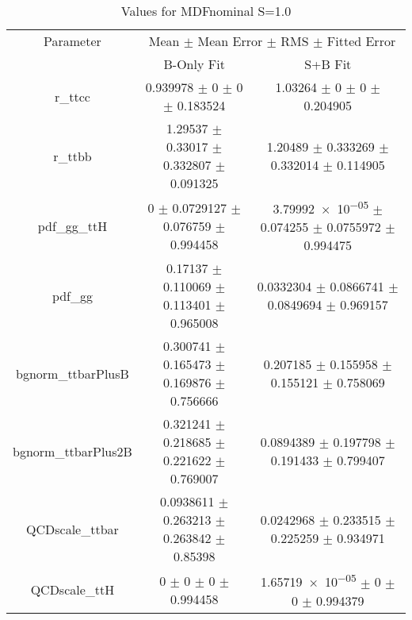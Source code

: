 \begin{table}
\centering
\caption{Values for MDFnominal S=1.0}
\begin{tabular}{ccc}
\toprule
Parameter & \multicolumn{2}{c}{Mean $\pm$ Mean Error $\pm$ RMS $\pm$ Fitted Error}\\
 & B-Only Fit & S+B Fit\\
\midrule
r\_ttcc & \num{0.939978} $\pm$ \num{0} $\pm$ \num{0} $\pm$ \num{0.183524} & \num{1.03264} $\pm$ \num{0} $\pm$ \num{0} $\pm$ \num{0.204905}\\
r\_ttbb & \num{1.29537} $\pm$ \num{0.33017} $\pm$ \num{0.332807} $\pm$ \num{0.091325} & \num{1.20489} $\pm$ \num{0.333269} $\pm$ \num{0.332014} $\pm$ \num{0.114905}\\
pdf\_gg\_ttH & \num{0} $\pm$ \num{0.0729127} $\pm$ \num{0.076759} $\pm$ \num{0.994458} & \num{3.79992e-05} $\pm$ \num{0.074255} $\pm$ \num{0.0755972} $\pm$ \num{0.994475}\\
pdf\_gg & \num{0.17137} $\pm$ \num{0.110069} $\pm$ \num{0.113401} $\pm$ \num{0.965008} & \num{0.0332304} $\pm$ \num{0.0866741} $\pm$ \num{0.0849694} $\pm$ \num{0.969157}\\
bgnorm\_ttbarPlusB & \num{0.300741} $\pm$ \num{0.165473} $\pm$ \num{0.169876} $\pm$ \num{0.756666} & \num{0.207185} $\pm$ \num{0.155958} $\pm$ \num{0.155121} $\pm$ \num{0.758069}\\
bgnorm\_ttbarPlus2B & \num{0.321241} $\pm$ \num{0.218685} $\pm$ \num{0.221622} $\pm$ \num{0.769007} & \num{0.0894389} $\pm$ \num{0.197798} $\pm$ \num{0.191433} $\pm$ \num{0.799407}\\
QCDscale\_ttbar & \num{0.0938611} $\pm$ \num{0.263213} $\pm$ \num{0.263842} $\pm$ \num{0.85398} & \num{0.0242968} $\pm$ \num{0.233515} $\pm$ \num{0.225259} $\pm$ \num{0.934971}\\
QCDscale\_ttH & \num{0} $\pm$ \num{0} $\pm$ \num{0} $\pm$ \num{0.994458} & \num{1.65719e-05} $\pm$ \num{0} $\pm$ \num{0} $\pm$ \num{0.994379}\\
\bottomrule
\end{tabular}
\end{table}